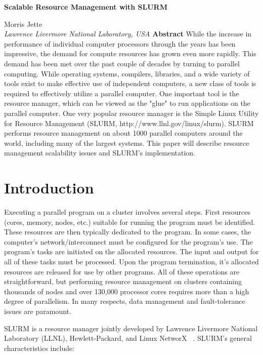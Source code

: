 \documentclass[10pt,twocolumn,times]{../common/llncs}
\def\ctit{Scalable Resource Management with SLURM}
\def\ucrl{UCRL-JC-TBD}
\def\auth{Morris Jette}
\def\pubdate{January 23, 2006}
\def\journal{Operating Systems Reviews}
\begin{document}

\noindent\Large
\textbf{\ctit}
\baselineskip
\noindent\large
{Morris Jette \\
{\em Lawrence Livermore National Laboratory, USA}
\baselineskip
\noindent\large
\textbf{Abstract}
\baselineskip
\noindent\normalsize
While the increase in performance of individual computer 
processors through the years has been impressive, the demand
for compute resources has grown even more rapidly. 
This demand has been met over the past couple of decades by 
turning to parallel computing. 
While operating systems, compilers, libraries, and a wide 
variety of tools exist to make effective use of independent 
computers, a new class of tools is required to effectively 
utilize a parallel computer. 
One important tool is the resource manager, which can be viewed 
as the "glue" to run applications on the parallel computer. 
One very popular resource manager is the Simple Linux
Utility for Resource Management (SLURM, 
http://www.llnl.gov/linux/slurm). 
SLURM performs resource management on about 1000 parallel 
computers around the world, including many of the largest 
systems. 
This paper will describe resource management scalability 
issues and SLURM's implementation.


\section{Introduction}

Executing a parallel program on a cluster involves several 
steps. First resources (cores, memory, nodes, etc.) suitable 
for running the program must be identified. These resources 
are then typically dedicated to the program. In some 
cases, the computer's network/interconnect must be 
configured for the program's use. The program's tasks
are initiated on the allocated resources. The input and 
output for all of these tasks must be processed. 
Upon the program termination, it's allocated resources 
are released for use by other programs. 
All of these operations are straightforward, but performing 
resource management on clusters containing thousands of 
nodes and over 130,000 processor cores requires more 
than a high degree of parallelism.
In many respects, data management and fault-tolerance issues
are paramount.

SLURM is a resource manager jointly developed by Lawrence 
Livermore National Laboratory (LLNL), 
Hewlett-Packard, and Linux NetworX
~\cite{SLURM2003,Yoo2003,SlurmWeb}.
SLURM's general characteristics include:

}
\end{document}
